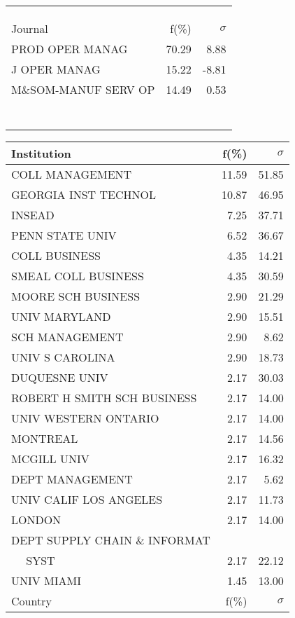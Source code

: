 \documentclass[a4paper,11pt]{report}
\begin{document}
\begin{landscape}
\begin{table}[!ht]
{\begin{tabular}{|l r  r|}
 &  & \\
 &  & \\
 &  & \\
\hline
\hline
Journal & f(\%) & $\sigma$\\
\hline
PROD OPER MANAG & 70.29 & 8.88\\
J OPER MANAG & 15.22 & -8.81\\
M\&SOM-MANUF SERV OP & 14.49 & 0.53\\
 &  & \\
 &  & \\
 &  & \\
 &  & \\
 &  & \\
 &  & \\
 &  & \\
\hline
\end{tabular}
}
{\scriptsize\begin{tabular}{|l r r|}
\hline
Institution & f(\%) & $\sigma$\\
\hline
COLL MANAGEMENT & 11.59 & 51.85\\
GEORGIA INST TECHNOL & 10.87 & 46.95\\
INSEAD & 7.25 & 37.71\\
PENN STATE UNIV & 6.52 & 36.67\\
COLL BUSINESS & 4.35 & 14.21\\
SMEAL COLL BUSINESS & 4.35 & 30.59\\
MOORE SCH BUSINESS & 2.90 & 21.29\\
UNIV MARYLAND & 2.90 & 15.51\\
SCH MANAGEMENT & 2.90 & 8.62\\
UNIV S CAROLINA & 2.90 & 18.73\\
DUQUESNE UNIV & 2.17 & 30.03\\
ROBERT H SMITH SCH BUSINESS & 2.17 & 14.00\\
UNIV WESTERN ONTARIO & 2.17 & 14.00\\
MONTREAL & 2.17 & 14.56\\
MCGILL UNIV & 2.17 & 16.32\\
DEPT MANAGEMENT & 2.17 & 5.62\\
UNIV CALIF LOS ANGELES & 2.17 & 11.73\\
LONDON & 2.17 & 14.00\\
DEPT SUPPLY CHAIN \& INFORMAT &  & \\
$\quad$ SYST & 2.17 & 22.12\\
UNIV MIAMI & 1.45 & 13.00\\
\hline
\hline
Country & f(\%) & $\sigma$\\

\end{tabular}}
\end{table}
\end{landscape}
\end{document}
